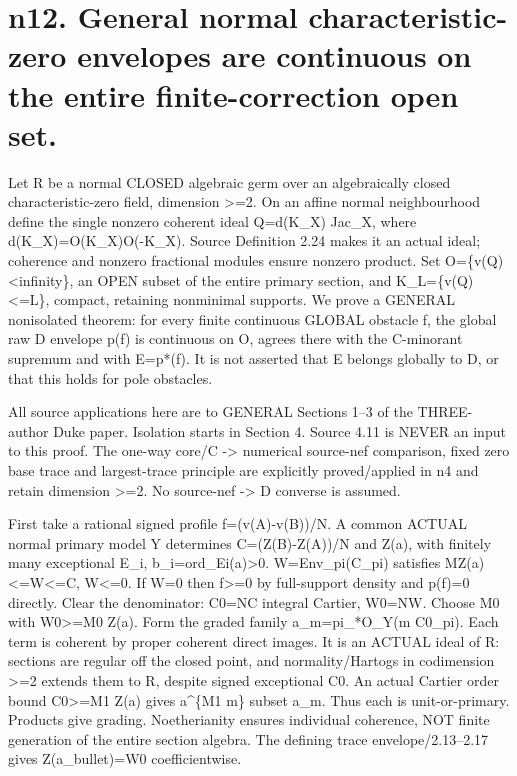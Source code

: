 \documentclass[11pt]{article}
\begin{document}
\section*{n12. General normal characteristic-zero envelopes are continuous on the entire finite-correction open set.}
Let R be a normal CLOSED algebraic germ over an algebraically closed characteristic-zero field, dimension >=2. On an affine normal neighbourhood define the single nonzero coherent ideal Q=d(K\_X) Jac\_X, where d(K\_X)=O(K\_X)O(-K\_X). Source Definition 2.24 makes it an actual ideal; coherence and nonzero fractional modules ensure nonzero product. Set O=\{v(Q)<infinity\}, an OPEN subset of the entire primary section, and K\_L=\{v(Q)<=L\}, compact, retaining nonminimal supports. We prove a GENERAL nonisolated theorem: for every finite continuous GLOBAL obstacle f, the global raw D envelope p(f) is continuous on O, agrees there with the C-minorant supremum and with E=p*(f). It is not asserted that E belongs globally to D, or that this holds for pole obstacles.

All source applications here are to GENERAL Sections 1--3 of the THREE-author Duke paper. Isolation starts in Section 4. Source 4.11 is NEVER an input to this proof. The one-way core/C -> numerical source-nef comparison, fixed zero base trace and largest-trace principle are explicitly proved/applied in n4 and retain dimension >=2. No source-nef -> D converse is assumed.

First take a rational signed profile f=(v(A)-v(B))/N. A common ACTUAL normal primary model Y determines C=(Z(B)-Z(A))/N and Z(a), with finitely many exceptional E\_i, b\_i=ord\_Ei(a)>0. W=Env\_pi(C\_pi) satisfies MZ(a)<=W<=C, W<=0. If W=0 then f>=0 by full-support density and p(f)=0 directly. Clear the denominator: C0=NC integral Cartier, W0=NW. Choose M0 with W0>=M0 Z(a). Form the graded family a\_m=pi\_*O\_Y(m C0\_pi). Each term is coherent by proper coherent direct images. It is an ACTUAL ideal of R: sections are regular off the closed point, and normality/Hartogs in codimension >=2 extends them to R, despite signed exceptional C0. An actual Cartier order bound C0>=M1 Z(a) gives a\textasciicircum{}\{M1 m\} subset a\_m. Thus each is unit-or-primary. Products give grading. Noetherianity ensures individual coherence, NOT finite generation of the entire section algebra. The defining trace envelope/2.13--2.17 gives Z(a\_bullet)=W0 coefficientwise.
\end{document}
